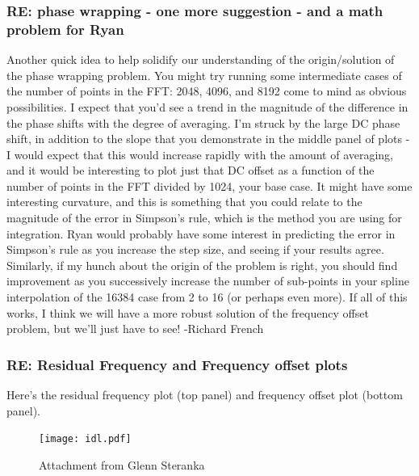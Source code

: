 \documentclass[crop=false,class=book]{standalone}
\begin{document}
\subsubsection{\footnotesize RE: phase wrapping - one more suggestion - and a math problem for Ryan}
Another quick idea to help solidify our understanding of the origin/solution of the phase wrapping problem. You might try running some intermediate cases of the number of points in the FFT: 2048, 4096, and 8192 come to mind as obvious possibilities. I expect that you'd see a trend in the magnitude of the difference in the phase shifts with the degree of averaging. I'm struck by the large DC phase shift, in addition to the slope that you demonstrate in the middle panel of plots - I would expect that this would increase rapidly with the amount of averaging, and it would be interesting to plot just that DC offset as a function of the number of points in the FFT divided by 1024, your base case. It might have some interesting curvature, and this is something that you could relate to the magnitude of the error in Simpson's rule, which is the method you are using for integration. Ryan would probably have some interest in predicting the error in Simpson's rule as you increase the step size, and seeing if your results agree. Similarly, if my hunch about the origin of the problem is right, you should find improvement as you successively increase the number of sub-points in your spline interpolation of the 16384 case from 2 to 16 (or perhaps even more). If all of this works, I think we will have a more robust solution of the frequency offset problem, but we'll just have to see! -Richard French
\subsubsection{\footnotesize RE: Residual Frequency and Frequency offset plots}
Here’s the residual frequency plot (top panel) and frequency offset plot (bottom panel).
\begin{figure}[H]
    \centering
    \texttt{[image: idl.pdf]}
    \caption{Attachment from Glenn Steranka}
\end{figure}
\end{document}
